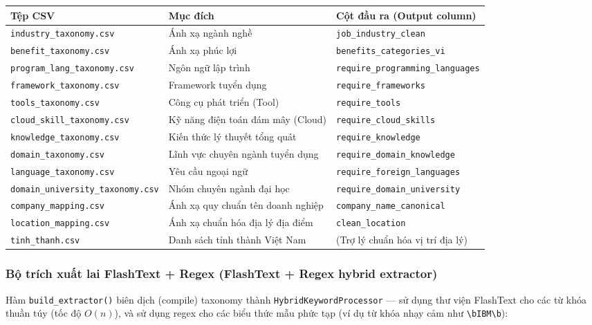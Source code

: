 \begin{longtable}{lll}
\toprule
\textbf{Tệp CSV} & \textbf{Mục đích} & \textbf{Cột đầu ra (Output column)} \\
\midrule
\endhead
\texttt{industry\_taxonomy.csv} & Ánh xạ ngành nghề & \texttt{job\_industry\_clean} \\
\texttt{benefit\_taxonomy.csv} & Ánh xạ phúc lợi & \texttt{benefits\_categories\_vi} \\
\texttt{program\_lang\_taxonomy.csv} & Ngôn ngữ lập trình & \texttt{require\_programming\_languages} \\
\texttt{framework\_taxonomy.csv} & Framework tuyển dụng & \texttt{require\_frameworks} \\
\texttt{tools\_taxonomy.csv} & Công cụ phát triển (Tool) & \texttt{require\_tools} \\
\texttt{cloud\_skill\_taxonomy.csv} & Kỹ năng điện toán đám mây (Cloud) & \texttt{require\_cloud\_skills} \\
\texttt{knowledge\_taxonomy.csv} & Kiến thức lý thuyết tổng quát & \texttt{require\_knowledge} \\
\texttt{domain\_taxonomy.csv} & Lĩnh vực chuyên ngành tuyển dụng & \texttt{require\_domain\_knowledge} \\
\texttt{language\_taxonomy.csv} & Yêu cầu ngoại ngữ & \texttt{require\_foreign\_languages} \\
\texttt{domain\_university\_taxonomy.csv} & Nhóm chuyên ngành đại học & \texttt{require\_domain\_university} \\
\texttt{company\_mapping.csv} & Ánh xạ quy chuẩn tên doanh nghiệp & \texttt{company\_name\_canonical} \\
\texttt{location\_mapping.csv} & Ánh xạ chuẩn hóa địa lý địa điểm & \texttt{clean\_location} \\
\texttt{tinh\_thanh.csv} & Danh sách tỉnh thành Việt Nam & (Trợ lý chuẩn hóa vị trí địa lý) \\
\bottomrule
\end{longtable}

\subsubsection{Bộ trích xuất lai FlashText + Regex (FlashText + Regex hybrid extractor)}

Hàm \texttt{build\_extractor()} biên dịch (compile) taxonomy thành \texttt{HybridKeywordProcessor}
— sử dụng thư viện FlashText cho các từ khóa thuần túy (tốc độ $O(n)$), và sử dụng regex cho các biểu thức mẫu phức tạp
(ví dụ từ khóa nhạy cảm như \texttt{\textbackslash bIBM\textbackslash b}):

